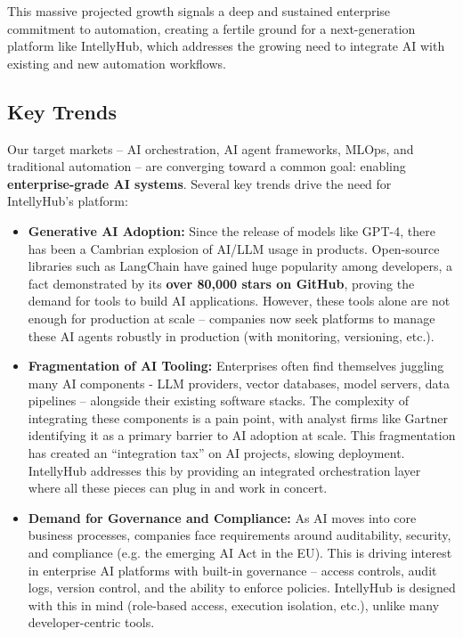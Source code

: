 This massive projected growth signals a deep and sustained enterprise commitment to automation, creating a fertile ground for a next-generation platform like IntellyHub, which addresses the growing need to integrate AI with existing and new automation workflows.

\subsection{Key Trends}
Our target markets – AI orchestration, AI agent frameworks, MLOps, and traditional automation – are converging toward a common goal: enabling \textbf{enterprise-grade AI systems}. Several key trends drive the need for IntellyHub's platform:

\begin{itemize}
    \item \textbf{Generative AI Adoption:} Since the release of models like GPT-4, there has been a Cambrian explosion of AI/LLM usage in products. Open-source libraries such as LangChain have gained huge popularity among developers, a fact demonstrated by its \textbf{over 80,000 stars on GitHub}\cite{langchainGitHub}, proving the demand for tools to build AI applications. However, these tools alone are not enough for production at scale – companies now seek platforms to manage these AI agents robustly in production (with monitoring, versioning, etc.). 
    
    \item \textbf{Fragmentation of AI Tooling:} Enterprises often find themselves juggling many AI components - LLM providers, vector databases, model servers, data pipelines – alongside their existing software stacks. The complexity of integrating these components is a pain point, with analyst firms like Gartner identifying it as a primary barrier to AI adoption at scale\cite{gartnerAIBarriers}. This fragmentation has created an “integration tax” on AI projects, slowing deployment. IntellyHub addresses this by providing an integrated orchestration layer where all these pieces can plug in and work in concert.
    
    \item \textbf{Demand for Governance and Compliance:} As AI moves into core business processes, companies face requirements around auditability, security, and compliance (e.g. the emerging AI Act in the EU\cite{euAIAct}). This is driving interest in enterprise AI platforms with built-in governance – access controls, audit logs, version control, and the ability to enforce policies. IntellyHub is designed with this in mind (role-based access, execution isolation, etc.), unlike many developer-centric tools.
    

\end{itemize}
